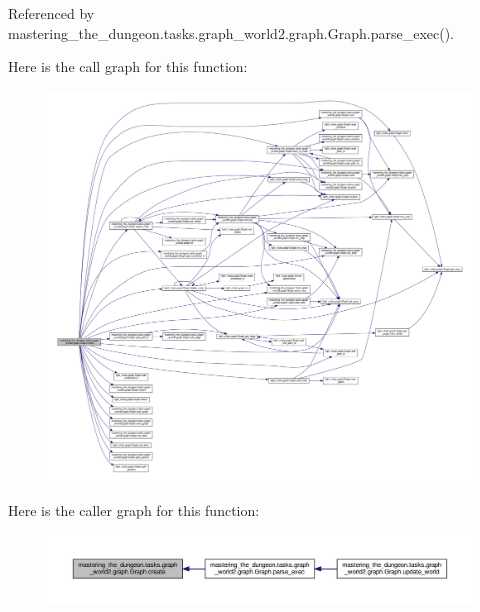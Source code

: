 Referenced by mastering\+\_\+the\+\_\+dungeon.\+tasks.\+graph\+\_\+world2.\+graph.\+Graph.\+parse\+\_\+exec().

Here is the call graph for this function\+:
\nopagebreak
\begin{figure}[H]
\begin{center}
\leavevmode
\includegraphics[width=350pt]{classmastering__the__dungeon_1_1tasks_1_1graph__world2_1_1graph_1_1Graph_af543d6256a0001e8c7d13285bdff2c1a_cgraph}
\end{center}
\end{figure}
Here is the caller graph for this function\+:
\nopagebreak
\begin{figure}[H]
\begin{center}
\leavevmode
\includegraphics[width=350pt]{classmastering__the__dungeon_1_1tasks_1_1graph__world2_1_1graph_1_1Graph_af543d6256a0001e8c7d13285bdff2c1a_icgraph}
\end{center}
\end{figure}
\mbox{\label{classmastering__the__dungeon_1_1tasks_1_1graph__world2_1_1graph_1_1Graph_a23edd3bef3ed5565ef4708f4a7ea1d38}} 
